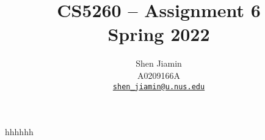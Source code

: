 \documentclass{article}
\title{\sffamily\bfseries
  CS5260 -- Assignment 6 \\
  Spring 2022
}
\author{
  Shen Jiamin \\
  A0209166A \\
  \href{mailto:shen_jiamin@u.nus.edu}{\nolinkurl{shen_jiamin@u.nus.edu}}
}
\date{}
\begin{document}
    \maketitle

    hhhhhh
\end{document}
